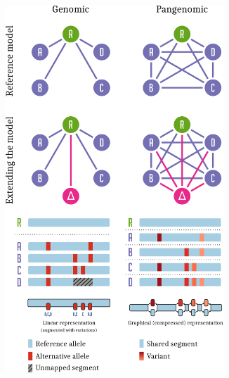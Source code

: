 

\begin{figure}[p]
  \begin{subfigure}[b]{0.5\textwidth}
    \includegraphics[width=0.9\textwidth]{figures/gen_vs_pang.pdf}
    \centering
  \end{subfigure}
  \begin{subfigure}[b]{0.5\textwidth}

\end{subfigure}
\end{figure}
